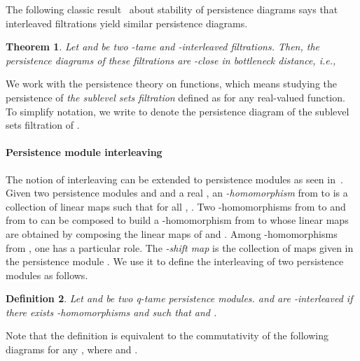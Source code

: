 \documentclass[a4paper]{article}
\newtheorem{theorem}{Theorem}[section]
\newtheorem{definition}[theorem]{Definition}
\begin{document}
The following classic result~\cite{ppmdCCGGO,sspmCDGO,spdCEH} about stability of persistence diagrams says that interleaved filtrations yield similar persistence diagrams.

\begin{theorem}\label{tstability}
Let  and  be two -tame and -interleaved filtrations. Then, the persistence diagrams of these filtrations are -close in bottleneck distance, i.e.,

\end{theorem}


We work with the persistence theory on functions, which means studying the persistence of \emph{the sublevel sets filtration} defined as  for any real-valued function.
To simplify notation, we write  to denote the persistence diagram of the sublevel sets filtration of .

\paragraph{Persistence module interleaving\\}
The notion of interleaving can be extended to persistence modules as seen in~\cite{psgcCDO}.
Given two persistence modules  and  and a real , an \emph{-homomorphism} from  to  is a collection of linear maps  such that for all , . 
Two -homomorphisms  from  to  and  from  to  can be composed to build a -homomorphism  from  to  whose linear maps are obtained by composing the linear maps of  and .
Among -homomorphisms from , one has a particular role.
The \emph{-shift map}  is the collection of maps  given in the persistence module .
We use it to define the interleaving of two persistence modules as follows.

\begin{definition}
Let  and  be two q-tame persistence modules.  and  are \emph{-interleaved} if there exists -homomorphisms  and  such that  and .
\end{definition}

Note that the definition is equivalent to the commutativity of the following diagrams for any , where  and .
\end{document}
